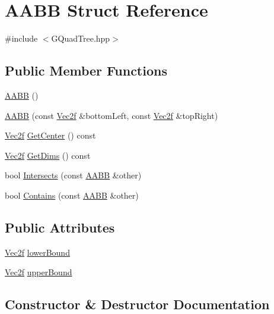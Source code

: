 \hypertarget{struct_a_a_b_b}{}\section{A\+A\+B\+B Struct Reference}
\label{struct_a_a_b_b}


{\ttfamily \#include $<$G\+Quad\+Tree.\+hpp$>$}

\subsection*{Public Member Functions}
\begin{DoxyCompactItemize}
\item 
\hyperlink{struct_a_a_b_b_a5f5baf6c533905aa1456b3a3eb57bab2}{A\+A\+B\+B} ()
\item 
\hyperlink{struct_a_a_b_b_ac8ac478c387d7ec8c5e8349bd612eea7}{A\+A\+B\+B} (const \hyperlink{class_vec2f}{Vec2f} \&bottom\+Left, const \hyperlink{class_vec2f}{Vec2f} \&top\+Right)
\item 
\hyperlink{class_vec2f}{Vec2f} \hyperlink{struct_a_a_b_b_a74723cb3022bf12cbe6da58016716bd3}{Get\+Center} () const 
\item 
\hyperlink{class_vec2f}{Vec2f} \hyperlink{struct_a_a_b_b_a7c2d618d07448c8e9edf48190a3c3944}{Get\+Dims} () const 
\item 
bool \hyperlink{struct_a_a_b_b_a35abf3de4df54cd6cbcdcce3437fd084}{Intersects} (const \hyperlink{struct_a_a_b_b}{A\+A\+B\+B} \&other)
\item 
bool \hyperlink{struct_a_a_b_b_ad0bd05f4708c46117cf0ebdb559c5e17}{Contains} (const \hyperlink{struct_a_a_b_b}{A\+A\+B\+B} \&other)
\end{DoxyCompactItemize}
\subsection*{Public Attributes}
\begin{DoxyCompactItemize}
\item 
\hyperlink{class_vec2f}{Vec2f} \hyperlink{struct_a_a_b_b_ab514bd32ebab5e7e0b4916bfaa2e0962}{lower\+Bound}
\item 
\hyperlink{class_vec2f}{Vec2f} \hyperlink{struct_a_a_b_b_a8f024de08dcd1c1f1e1adc8af3fbb864}{upper\+Bound}
\end{DoxyCompactItemize}


\subsection{Constructor \& Destructor Documentation}
\hypertarget{struct_a_a_b_b_a5f5baf6c533905aa1456b3a3eb57bab2}{}
